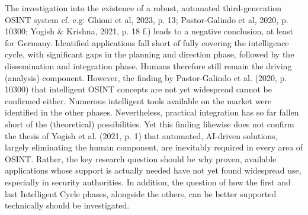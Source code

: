 \documentclass[10pt]{article}
\begin{document}
The investigation into the existence of a robust, automated third-generation OSINT system
cf. e.g: Ghioni et al, 2023, p. 13; Pastor-Galindo et al, 2020, p. 10300; Yogish & Krishna, 2021, p. 18 f.)
leads to a negative conclusion, at least for Germany. Identified applications fall short of fully covering
the intelligence cycle, with significant gaps in the planning and direction phase,
followed by the dissemination and integration phase. Humans therefore still remain the driving (analysis)
component. However, the finding by Pastor-Galindo et al. (2020, p. 10300) that intelligent OSINT
concepts are not yet widespread cannot be confirmed either. Numerous intelligent tools available
on the market were identified in the other phases. Nevertheless, practical integration has so far
fallen short of the (theoretical) possibilities. Yet this finding likewise does not confirm the
thesis of Yogish et al. (2021, p. 1) that automated, AI-driven solutions, largely eliminating
the human component, are inevitably required in every area of OSINT. Rather, the key research
question should be why proven, available applications whose support is actually needed have not
yet found widespread use, especially in security authorities. In addition, the question of how the
first and last Intelligent Cycle phases, alongside the others, can be better supported technically
should be investigated.
\end{document}
